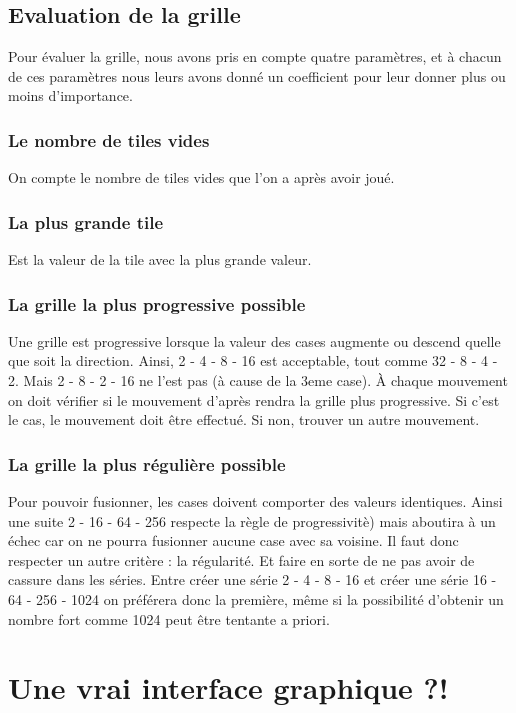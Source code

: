 \documentclass[12pt]{article}
\begin{document}
\subsection{Evaluation de la grille}
\label{eval_grid}
Pour évaluer la grille, nous avons pris en compte quatre paramètres, et à chacun
de ces paramètres nous leurs avons donné un coefficient pour leur donner plus ou
moins d'importance. \cite{Eval}

\subsubsection{Le nombre de tiles vides}
On compte le nombre de tiles vides que l'on a après avoir joué.
\subsubsection{La plus grande tile} 
Est la valeur de la tile avec la plus grande valeur.

\subsubsection{La grille la plus progressive possible}
Une grille est progressive lorsque la valeur des cases augmente ou descend
quelle que soit la direction. Ainsi, 2 - 4 - 8 - 16 est acceptable, tout comme
32 - 8 - 4 - 2. Mais 2 - 8 - 2 - 16 ne l'est pas (\`a cause de la 3eme case).
\`A chaque mouvement on doit vérifier si  le mouvement d'apr\`es rendra la
grille plus progressive. Si c'est le cas, le mouvement doit \^etre effectu\'e.
Si non, trouver un autre mouvement.

\subsubsection{La grille la plus réguli\`ere possible}
Pour pouvoir fusionner, les cases doivent comporter des valeurs identiques.
Ainsi une suite 2 - 16 - 64 - 256 respecte la r\`egle de progressivit\`e) mais
aboutira à un \'echec car on ne pourra fusionner aucune case avec sa voisine. Il
faut donc respecter un autre crit\`ere : la r\'egularit\'e. Et faire en sorte de
ne pas avoir de cassure dans les s\'eries. Entre cr\'eer une série 2 - 4 - 8 -
16 et cr\'eer une s\'erie 16 - 64 - 256 - 1024 on pr\'ef\'erera donc la
premi\`ere, m\^eme si la possibilit\'e d'obtenir un nombre fort comme 1024 peut
\^etre tentante a priori.

\newpage
\section{Une vrai interface graphique ?!}
\end{document}
